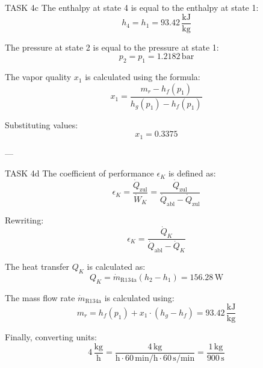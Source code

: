 TASK 4c  
The enthalpy at state 4 is equal to the enthalpy at state 1:  
\[
h_4 = h_1 = 93.42 \, \frac{\text{kJ}}{\text{kg}}
\]  

The pressure at state 2 is equal to the pressure at state 1:  
\[
p_2 = p_1 = 1.2182 \, \text{bar}
\]  

The vapor quality \( x_1 \) is calculated using the formula:  
\[
x_1 = \frac{m_r - h_f(p_1)}{h_g(p_1) - h_f(p_1)}
\]  

Substituting values:  
\[
x_1 = 0.3375
\]  

---

TASK 4d  
The coefficient of performance \( \epsilon_K \) is defined as:  
\[
\epsilon_K = \frac{\dot{Q}_{\text{zul}}}{\dot{W}_K} = \frac{\dot{Q}_{\text{zul}}}{\dot{Q}_{\text{abl}} - \dot{Q}_{\text{zul}}}
\]  

Rewriting:  
\[
\epsilon_K = \frac{\dot{Q}_K}{\dot{Q}_{\text{abl}} - \dot{Q}_K}
\]  

The heat transfer \( Q_K \) is calculated as:  
\[
Q_K = \dot{m}_{\text{R134a}} (h_2 - h_1) = 156.28 \, \text{W}
\]  

The mass flow rate \( \dot{m}_{\text{R134a}} \) is calculated using:  
\[
m_r = h_f(p_1) + x_1 \cdot (h_g - h_f) = 93.42 \, \frac{\text{kJ}}{\text{kg}}
\]  

Finally, converting units:  
\[
4 \, \frac{\text{kg}}{\text{h}} = \frac{4 \, \text{kg}}{\text{h} \cdot 60 \, \text{min/h} \cdot 60 \, \text{s/min}} = \frac{1 \, \text{kg}}{900 \, \text{s}}
\]  